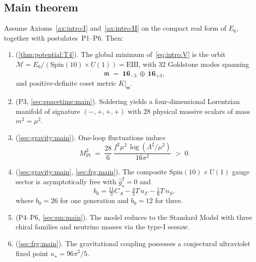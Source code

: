 \subsection{Main theorem}
\label{sec:intro:claim}

\begin{theorem}\label{thm:intro:embedding}
Assume Axioms~\autoref{ax:intro:I} and~\autoref{ax:intro:II} on the compact real
form of $E_6$, together with postulates~\textnormal{P1--P6}. Then:
\begin{enumerate}[label=\textup{(\roman*)}]
  \item \textnormal{(\autoref{thm:potential:T4}).}
    The global minimum of~\eqref{eq:intro:V} is the orbit
    $\mathcal{M}=E_6/(\mathrm{Spin}(10)\times U(1))=\mathrm{EIII}$,
    with $32$ Goldstone modes spanning
    \begin{equation}
      \mathfrak{m}\;=\;\mathbf{16}_{-3}\,\oplus\,\overline{\mathbf{16}}_{+3},
      \label{eq:intro:coset}
    \end{equation}
    and positive-definite coset metric $K|_{\mathfrak{m}}$.
  \item \textnormal{(P3, \autoref{sec:spacetime:main}).}
    Soldering yields a four-dimensional Lorentzian manifold of signature
    $(-,+,+,+)$ with $28$ physical massive scalars of mass $m^{2}=\mu^{2}$.
  \item \textnormal{(\autoref{sec:gravity:main}).}
    One-loop fluctuations induce
    \begin{equation}
      M_{\mathrm{Pl}}^{2}\;=\;\frac{28}{6}\,
      \frac{f^{2}\mu^{2}\,\log(\Lambda^{2}/\mu^{2})}{16\pi^{2}}\;>\;0.
      \label{eq:intro:MPl}
    \end{equation}
  \item \textnormal{(\autoref{sec:gravity:main}, \autoref{sec:frg:main}).}
    The composite $\mathrm{Spin}(10)\times U(1)$ gauge sector is asymptotically
    free with $\hat g^{2}_\star=0$ and
    \begin{equation}
      b_0=\tfrac{11}{3}C_A-\tfrac{4}{3}T\,n_F-\tfrac{1}{6}T\,n_S,
      \label{eq:intro:betag}
    \end{equation}
    where $b_0=26$ for one generation and $b_0=12$ for three.
  \item \textnormal{(P4--P6, \autoref{sec:sm:main}).}
    The model reduces to the Standard Model with three chiral families and
    neutrino masses via the type-I seesaw.
  \item \textnormal{(\autoref{sec:frg:main}).}
    The gravitational coupling possesses a conjectural ultraviolet fixed point
    $\kappa_\star=96\pi^{2}/5$.
\end{enumerate}
\end{theorem}

